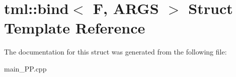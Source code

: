 \hypertarget{structtml_1_1bind}{\section{tml\+:\+:bind$<$ F, A\+R\+G\+S $>$ Struct Template Reference}
\label{structtml_1_1bind}
}


The documentation for this struct was generated from the following file\+:\begin{DoxyCompactItemize}
\item 
main\+\_\+\+P\+P.\+cpp\end{DoxyCompactItemize}
